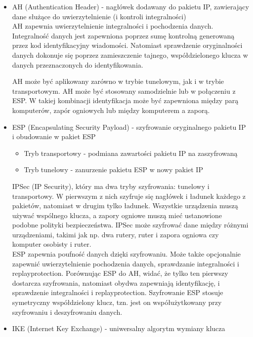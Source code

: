 \documentclass[main.tex]{subfiles}
\begin{document}
    \begin{itemize}
        \item AH (Authentication Header) - nagłówek dodawany do pakietu IP, zawierający dane służące do uwierzytelnienie (i kontroli integralności)\\
        AH zapewnia uwierzytelnienie integralności i pochodzenia danych. Integralność danych jest zapewniona poprzez sumę kontrolną generowaną przez kod identyfikacyjny wiadomości. Natomiast sprawdzenie oryginalności danych dokonuje się poprzez zamieszczenie tajnego, współdzielonego klucza w danych przeznaczonych do identyfikowania.

        AH może być aplikowany zarówno w trybie tunelowym, jak i w trybie transportowym. AH może być stosowany samodzielnie lub w połączeniu z ESP. W takiej kombinacji identyfikacja może być zapewniona między parą komputerów, zapór ogniowych lub między komputerem a zaporą.

        \item ESP (Encapsulating Security Payload) - szyfrowanie oryginalnego pakietu IP i obudowanie w pakiet ESP
        \begin{itemize}
            \item Tryb transportowy - podmiana zawartości pakietu IP na zaszyfrowaną
            \item Tryb tunelowy - zanurzenie pakietu ESP w nowy pakiet IP
        \end{itemize}
        IPSec (IP Security), który ma dwa tryby szyfrowania: tunelowy i transportowy. W pierwszym z nich szyfruje się nagłówek i ładunek każdego z pakietów, natomiast w drugim tylko ładunek. Wszystkie urządzenia muszą używać wspólnego klucza, a zapory ogniowe muszą mieć ustanowione podobne polityki bezpieczeństwa. IPSec może szyfrować dane między różnymi urządzeniami, takimi jak np. dwa rutery, ruter i zapora ogniowa czy komputer osobisty i ruter.\\

        ESP zapewnia poufność danych dzięki szyfrowaniu. Może także opcjonalnie zapewnić uwierzytelnienie pochodzenia danych, sprawdzanie integralności i replayprotection. Porównując ESP do AH, widać, że tylko ten pierwszy dostarcza szyfrowania, natomiast obydwa zapewniają identyfikację, i sprawdzenie integralności i replayprotection. Szyfrowanie ESP stosuje symetryczny współdzielony klucz, tzn. jest on współużytkowany przy szyfrowaniu i deszyfrowaniu danych.
        \item IKE (Internet Key Exchange) - uniwersalny algorytm wymiany klucza
    \end{itemize}
\end{document}
